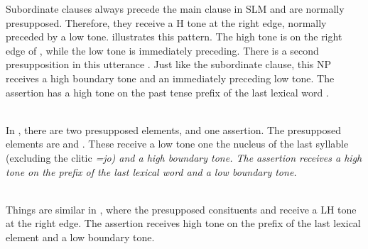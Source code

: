 Subordinate clauses always precede the main clause in SLM and are normally presupposed. Therefore, they receive a H tone at the right edge, normally preceded by a low tone.  illustrates this pattern. The high tone is on the right edge of , while the low tone is immediately preceding. There is a second presupposition in this utterance . Just like the subordinate clause, this NP receives a high boundary tone and an immediately preceding low tone. The assertion has a high tone on the past tense prefix of the last lexical word .


 \\


In  , there are two presupposed elements, and one assertion. The presupposed elements are  and . These receive a low tone one the nucleus of the last syllable (excluding the clitic \em =jo\em) and a high boundary tone. The assertion  receives a high tone on the prefix of the last lexical word  and a low boundary tone. 

 \\
Things are similar in , where the presupposed consituents  and  receive a LH tone at the right edge. The assertion  receives high tone on the prefix of the last lexical element and a low boundary tone.

